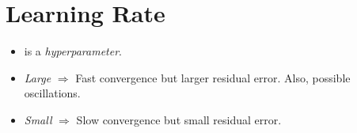 \documentclass[
	title={Logistic Regression}
]{cs584notes}
\begin{document}
\section{Learning Rate}\label{sec:learning-rate}
\begin{itemize}
	\item \data{$\eta$} is a \emph{hyperparameter}.
	\item \emph{Large} \data{$\eta$} $\Rightarrow$ Fast convergence but larger residual error.
	Also, possible oscillations.
	\item \emph{Small} \data{$\eta$} $\Rightarrow$ Slow convergence but small residual error.
\end{itemize}
\end{document}
